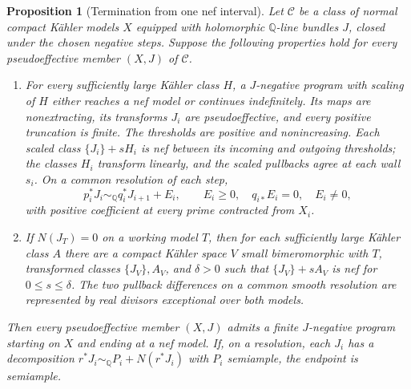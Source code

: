 \documentclass[11pt,a4paper]{article}
\numberwithin{equation}{section}
\newtheorem{proposition}[theorem]{Proposition}
\theoremstyle{definition}
\theoremstyle{remark}
\newcommand{\Q}{\mathbb Q}\newcommand{\R}{\mathbb R}
\begin{document}
\begin{proposition}[Termination from one nef interval]
\label{prop:termination-criterion}
Let $\mathscr C$ be a class of normal compact Kähler models $X$
equipped with holomorphic $\Q$-line bundles $J$, closed under the chosen
negative steps. Suppose the following properties hold for every
pseudoeffective member $(X,J)$ of $\mathscr C$.
\begin{enumerate}[label=\textup{(\roman*)},leftmargin=*]
\item For every sufficiently large Kähler class $H$, a $J$-negative
program with scaling of $H$ either reaches a nef model or continues
indefinitely. Its maps are nonextracting, its transforms $J_i$
are pseudoeffective, and every positive truncation is finite.
The thresholds are positive and nonincreasing. Each scaled class
$\{J_i\}+sH_i$ is nef between its incoming and outgoing thresholds;
the classes $H_i$ transform linearly, and the scaled pullbacks
agree at each wall $s_i$.
On a common resolution of each step,
\[
 p_i^*J_i\sim_{\Q}q_i^*J_{i+1}+E_i,
 \qquad E_i\ge0,\quad q_{i*}E_i=0,\quad E_i\ne0,
\]
with positive coefficient at every prime contracted from $X_i$.
\item If $N(J_T)=0$ on a working model $T$, then for each
sufficiently large Kähler class $A$ there are a compact Kähler
space $V$ small bimeromorphic with $T$, transformed classes
$\{J_V\},A_V$, and $\delta>0$ such that
$\{J_V\}+sA_V$ is nef for $0\le s\le\delta$.
The two pullback differences on a common smooth resolution are
represented by real divisors exceptional over both models.
\end{enumerate}
Then every pseudoeffective member $(X,J)$ admits a finite
$J$-negative program starting on $X$ and ending at a nef model. If, on a resolution,
each $J_i$ has a decomposition
$r^*J_i\sim_{\Q}P_i+N(r^*J_i)$ with $P_i$ semiample, the endpoint
is semiample.
\end{proposition}
\end{document}
